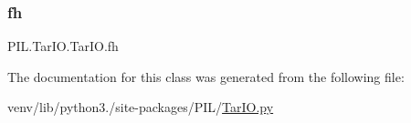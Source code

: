 \subsubsection{\texorpdfstring{fh}{fh}}
{\footnotesize\ttfamily P\+I\+L.\+Tar\+I\+O.\+Tar\+I\+O.\+fh}



The documentation for this class was generated from the following file\+:\begin{DoxyCompactItemize}
\item 
venv/lib/python3./site-\/packages/\+P\+I\+L/\hyperlink{TarIO_8py}{Tar\+I\+O.\+py}\end{DoxyCompactItemize}
